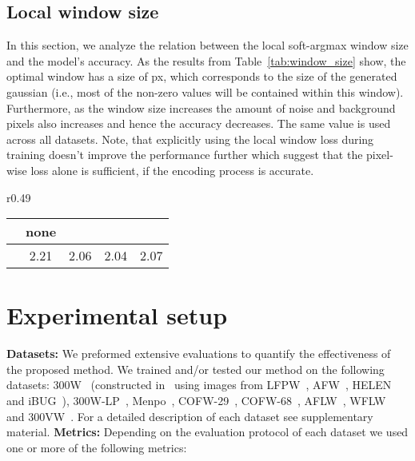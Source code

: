 \documentclass{bmvc2k}
\begin{document}
\subsection{Local window size}\label{ssec:windows-size}

In this section, we analyze the relation between the local soft-argmax window size and the model's accuracy. As the results from Table~\ref{tab:window_size} show, the optimal window has a size of px, which corresponds to the size of the generated gaussian (i.e., most of the non-zero values will be contained within this window). Furthermore, as the window size increases the amount of noise and background pixels also increases and hence the accuracy decreases. The same value is used across all datasets. Note, that explicitly using the local window loss during training doesn't improve the performance further which suggest that the pixel-wise loss alone is sufficient, if the encoding process is accurate.  

\begin{wraptable}[7]{r}{0.49\textwidth}
\vspace{-0.3cm}
\centering
    \begin{tabular}{c|cccc}
    \toprule
          & none &  &  &   \\
         \midrule
        & 2.21 & 2.06 & 2.04 & 2.07 \\
     \bottomrule
    \end{tabular}
        \caption{Effect of window size on the 300W test set.}
    \label{tab:window_size}
\end{wraptable}


\vspace{-0.3cm}
\section{Experimental setup}

\textbf{Datasets:}
We preformed extensive evaluations to quantify the effectiveness of the proposed method. We trained and/or tested our method on the following datasets: 300W~\cite{sagonas2013300} (constructed in~\cite{sagonas2013300} using images from LFPW~\cite{belhumeur2013localizing}, AFW~\cite{zhu2012face}, HELEN~\cite{le2012interactive} and iBUG~\cite{sagonas2013semi}), 300W-LP~\cite{zhu2016face}, Menpo~\cite{zafeiriou2017menpo}, COFW-29~\cite{burgos2013robust}, COFW-68~\cite{ghiasi2015occlusion}, AFLW~\cite{kostinger2011annotated}, WFLW~\cite{wayne2018lab} and 300VW~\cite{shen2015first}. For a detailed description of each dataset see supplementary material.
\newline\newline
\noindent\textbf{Metrics:}
Depending on the evaluation protocol of each dataset we used one or more of the following metrics:
\end{document}
